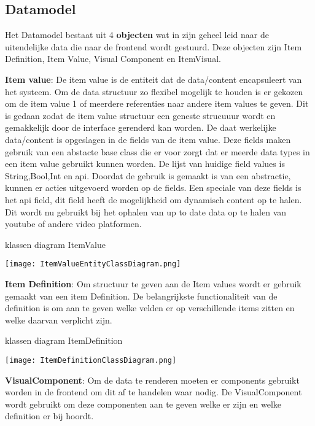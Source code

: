 \subsection{Datamodel}
Het Datamodel bestaat uit 4 \textbf{objecten} wat in zijn geheel leid naar de uitendelijke data die naar de frontend wordt gestuurd.
Deze objecten zijn Item Definition, Item Value, Visual Component en ItemVisual.

\whitespace[2]
\textbf{Item value}: De item value is de entiteit dat de data/content encapsuleert van het systeem.
Om de data structuur zo flexibel mogelijk te houden is er gekozen om de item value 1 of meerdere referenties naar andere item values te geven.
Dit is gedaan zodat de item value structuur een geneste strucuuur wordt en gemakkelijk door de interface gerenderd kan worden.
De daat werkelijke data/content is opgeslagen in de fields van de item value.
Deze fields maken gebruik van een abstacte base class die er voor zorgt dat er meerde data types in een item value gebruikt kunnen worden.
De lijst van huidige field values is String,Bool,Int en api.
Doordat de gebruik is gemaakt is van een abstractie, kunnen er acties uitgevoerd worden op de fields.
Een speciale van deze fields is het api field, dit field heeft de mogelijkheid om dynamisch content op te halen.
Dit wordt nu gebruikt bij het ophalen van up to date data op te halen van youtube of andere video platformen. 

\whitespace[2]
\begin{graphic}
    \captionsetup{type=figure}
    \caption{klassen diagram ItemValue}
    \texttt{[image: ItemValueEntityClassDiagram.png]}
    \label{fig:ItemValueEntityClassDiagram}
\end{graphic}

\whitespace[2]
\textbf{Item Definition}: Om structuur te geven aan de Item values wordt er gebruik gemaakt van een item Definition.
        De belangrijkste functionaliteit van de definition is om aan te geven welke velden er op verschillende items zitten en welke daarvan verplicht zijn.

\whitespace[2]
\begin{graphic}
    \captionsetup{type=figure}
    \caption{klassen diagram ItemDefinition}
    \texttt{[image: ItemDefinitionClassDiagram.png]}
    \label{fig:ItemDefinitionClassDiagram}
\end{graphic}

\whitespace[2]
\textbf{VisualComponent}: Om de data te renderen moeten er components gebruikt worden in de frontend om dit af te handelen waar nodig.
De VisualComponent wordt gebruikt om deze componenten aan te geven welke er zijn en welke definition er bij hoordt.


